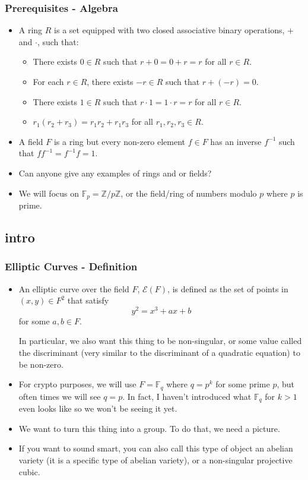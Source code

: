 \documentclass[aspectratio=169,t]{beamer}
\newcommand{\ZZ}{\mathbb{Z}}
\newcommand{\FF}{\mathbb{F}}
\begin{document}
\begin{frame}
\frametitle{Prerequisites - Algebra}
\begin{itemize}
\item
A ring $R$ is a set equipped with two closed associative binary operations, $+$
and $\cdot$, such that:
\begin{itemize}
\item
There exists $0 \in R$ such that $r + 0 = 0 + r = r$ for all $r \in R$.
\item
For each $r \in R$, there exists $-r \in R$ such that $r + (-r) = 0$.
\item
There exists $1 \in R$ such that $r \cdot 1 = 1 \cdot r = r$ for all $r \in R$.
\item
$r_1 (r_2 + r_3) = r_1 r_2 + r_1 r_3$ for all $r_1, r_2, r_3 \in R$.
\end{itemize}
\item
A field $F$ is a ring but every non-zero element $f \in F$ has an inverse
$f^{-1}$ such that $f f^{-1} = f^{-1} f = 1$.
\item
Can anyone give any examples of rings and or fields? \pause
\item
We will focus on $\FF_p = \ZZ / p \ZZ$, or the field/ring of numbers modulo $p$
where $p$ is prime.
\end{itemize}
\end{frame}

\subsection{intro}
\begin{frame}
\frametitle{Elliptic Curves - Definition}
\begin{itemize}
\item
An elliptic curve over the field $F$, $\mathcal{E}(F)$, is defined as the set of
points in $(x, y) \in F^2$ that satisfy
\[ y^2 = x^3 + ax + b \]
for some $a, b \in F$.

In particular, we also want this thing to be non-singular, or some value called
the discriminant (very similar to the discriminant of a quadratic equation) to
be non-zero. \pause
\item
For crypto purposes, we will use $F = \FF_q$ where $q = p^k$ for some prime $p$,
but often times we will see $q = p$. In fact, I haven't introduced what $\FF_q$
for $k > 1$ even looks like so we won't be seeing it yet. \pause
\item
We want to turn this thing into a group. To do that, we need a picture.
\item
If you want to sound smart, you can also call this type of object an abelian
variety (it is a specific type of abelian variety), or a non-singular projective
cubic.
\end{itemize}
\end{frame}
\end{document}
